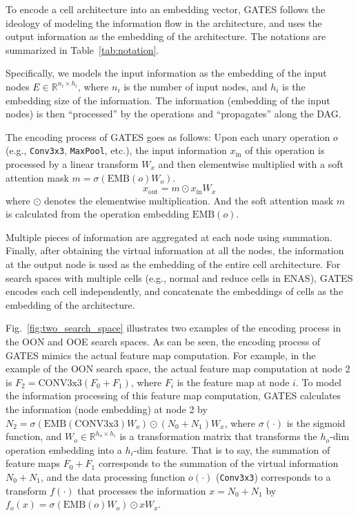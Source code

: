 \documentclass[runningheads]{llncs}
\begin{document}
To encode a cell architecture into an embedding vector, GATES follows the ideology of modeling the information flow in the architecture, and uses the output information as the embedding of the architecture. The notations are summarized in Table~\ref{tab:notation}.

Specifically, we models the input information as the embedding of the input nodes $E \in \mathbb{R}^{n_i\times h_i}$, where $n_i$ is the number of input nodes,
and $h_i$ is the embedding size of the information.
The information (embedding of the input nodes) is then ``processed'' by the operations and ``propagates'' along the DAG.

The encoding process of GATES goes as follows: Upon each unary operation $o$ (e.g., \texttt{Conv3x3}, \texttt{MaxPool}, etc.), the input information $x_{\mbox{in}}$ of this operation is processed by a linear transform $W_x$ and then elementwise multiplied with a soft attention mask $m=\sigma(\mbox{EMB}(o)W_o)$.
\begin{equation}
  x_{\mbox{out}} = m \odot x_{\mbox{in}} W_x
\end{equation}
where $\odot$ denotes the elementwise multiplication. And the soft attention mask $m$ is calculated from the operation embedding $\mbox{EMB}(o)$.

Multiple pieces of information are aggregated at each node using summation.
Finally, after obtaining the virtual information at all the nodes, the information at the output node is used as the embedding of the entire cell architecture. For search spaces with multiple cells (e.g., normal and reduce cells in ENAS), GATES encodes each cell independently, and concatenate the embeddings of cells as the embedding of the architecture.



Fig.~\ref{fig:two_search_space} illustrates two examples of the encoding process in the OON and OOE search spaces. As can be seen, the encoding process of GATES mimics the actual feature map computation.
For example, in the example of the OON search space, the actual feature map computation at node 2 is $F_2 = \mbox{CONV3x3}(F_0 + F_1)$, where $F_i$ is the feature map at node $i$.
To model the information processing of this feature map computation, GATES calculates the information (node embedding) at node 2 by $N_2 = \sigma(\mbox{EMB}(\mbox{CONV3x3})W_o) \odot (N_0 + N_1) W_x$, where $\sigma(\cdot)$ is the sigmoid function, and $W_o \in \mathbb{R}^{h_o \times h_i}$ is a transformation matrix that transforms the $h_o$-dim operation embedding into a $h_i$-dim feature.
That is to say, the summation of feature maps $F_0 + F_1$ corresponds to the summation of the virtual information $N_0 + N_1$, and the data processing function $o(\cdot)$ (\texttt{Conv3x3}) corresponds to a transform
$f(\cdot)$ that processes the information $x = N_0 + N_1$ by $f_o(x) = \sigma(\mbox{EMB}(o)W_o) \odot x W_x$.
\end{document}
